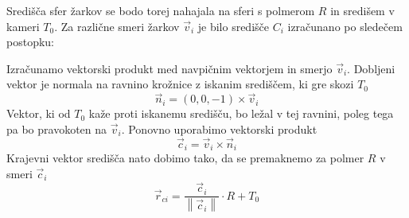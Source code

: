 \documentclass[titlepage]{article}
\begin{document}
Središča sfer žarkov se bodo torej nahajala na sferi s polmerom \( R \) in središem v kameri \( T_{0} \). Za različne smeri žarkov \(\vec{v}_{i} \) je bilo središče \( C_{i} \) izračunano po sledečem postopku:

\bigskip

Izračunamo vektorski produkt med navpičnim vektorjem in smerjo \( \vec{v}_{i} \). Dobljeni vektor je normala na ravnino krožnice z iskanim središčem, ki gre skozi \( T_{0} \)
\begin{equation} \label{e:sphC1}
    \vec{n}_{i}=(0, 0, -1) \times \vec{v}_{i}
\end{equation}
Vektor, ki od \( T_{0} \) kaže proti iskanemu središču, bo ležal v tej ravnini, poleg tega pa bo pravokoten na \( \vec{v}_{i} \). Ponovno uporabimo vektorski
produkt
\begin{equation}\label{e:sphC2}
    \vec{c}_{i}= \vec{v}_{i} \times \vec{n}_{i}
\end{equation}
Krajevni vektor središča nato dobimo tako, da se premaknemo za polmer \( R \) v smeri \( \vec{c}_{i} \)
\begin{equation}\label{e:sphC3}
    \vec{r}_{ci}=\frac{\vec{c}_{i}}{\left \| \vec{c}_{i}\right \|} \cdot R + T_{0}
\end{equation}
\end{document}
